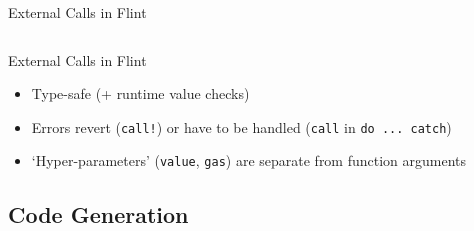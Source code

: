 \documentclass[aspectratio=169]{beamer}
\begin{document}
\begin{frame}{External Calls in Flint}
    \inputminted{swift}{code/external-calls.flint}
\end{frame}

\begin{frame}{External Calls in Flint}
    \begin{itemize}
        \item Type-safe (+ runtime value checks)
        \item Errors revert (\texttt{call!}) or have to be handled (\texttt{call} in \texttt{do ... catch})
        \item `Hyper-parameters' (\texttt{value}, \texttt{gas}) are separate from function arguments
    \end{itemize}
\end{frame}

\subsection{Code Generation}
\end{document}
